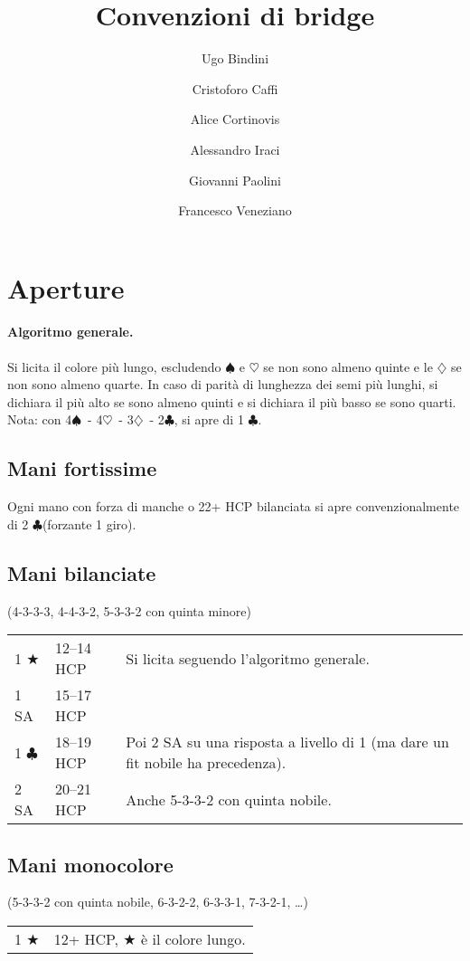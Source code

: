 \documentclass[a4paper,10pt]{article}
\title{Convenzioni di bridge}
\author{Ugo Bindini \and Cristoforo Caffi \and Alice Cortinovis \and Alessandro Iraci \and Giovanni Paolini \and Francesco Veneziano}
\renewcommand{\c}{$\clubsuit$\xspace}
\renewcommand{\d}{$\diamondsuit$\xspace}
\newcommand{\h}{$\heartsuit$\xspace}
\newcommand{\s}{$\spadesuit$\xspace}
\renewcommand{\j}{$\bigstar$\xspace}
\newcommand{\sa}{SA\xspace}
\newcommand{\smallspace}{\vskip0.3cm}
\newenvironment{twocol}
  {\smallspace\noindent\begin{tabular}{l p{0.78\textwidth}}}
  {\end{tabular}\smallspace}
\newenvironment{threecol}
  {\smallspace\noindent\begin{tabular}{l l p{0.78\textwidth}}}
  {\end{tabular}\smallspace}
\begin{document}
\maketitle

\tableofcontents

\pagebreak
\section{Aperture}


\paragraph{Algoritmo generale.}
Si licita il colore più lungo, escludendo \s e \h se non sono almeno quinte e le \d se non sono almeno quarte.
In caso di parità di lunghezza dei semi più lunghi, si dichiara il più alto se sono almeno quinti e si dichiara il più basso se sono quarti.
Nota: con 4\s\ - 4\h\ - 3\d\ - 2\c, si apre di 1 \c.

\subsection{Mani fortissime}

Ogni mano con forza di manche o 22+ HCP bilanciata si apre convenzionalmente di 2 \c (forzante 1 giro).

\subsection{Mani bilanciate}
(4-3-3-3, 4-4-3-2, 5-3-3-2 con quinta minore)
\smallspace

\begin{threecol}
 1 \j & 12--14 HCP & Si licita seguendo l'algoritmo generale. \\
 1 \sa & 15--17 HCP & \\
 1 \c & 18--19 HCP & Poi 2 \sa su una risposta a livello di 1 (ma dare un fit nobile ha precedenza). \\
 2 \sa & 20--21 HCP & Anche 5-3-3-2 con quinta nobile.
\end{threecol}


\subsection{Mani monocolore}
(5-3-3-2 con quinta nobile, 6-3-2-2, 6-3-3-1, 7-3-2-1, \dots)

\begin{twocol}
 1 \j & 12+ HCP, \j è il colore lungo.
\end{twocol}
\end{document}
